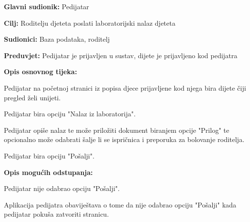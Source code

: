 					\noindent {}
					\begin{packed_item}
						
						\item \textbf{Glavni sudionik: }Pedijatar
						\item  \textbf{Cilj:} Roditelju djeteta poslati laboratorijski nalaz djeteta
						\item  \textbf{Sudionici:} Baza podataka, roditelj
						\item  \textbf{Preduvjet:} Pedijatar je prijavljen u sustav, dijete je prijavljeno kod pedijatra
						\item  \textbf{Opis osnovnog tijeka:}
						
						\item[] \begin{packed_enum}
							
							\item Pedijatar na početnoj stranici iz popisa djece prijavljene kod njega bira dijete čiji pregled želi unijeti.
							\item Pedijatar bira opciju "Nalaz iz laboratorija".
							\item Pedijatar opiše nalaz te može priložiti dokument biranjem opcije "Prilog" te opcionalno može odabrati šalje li se ispričnica i preporuka za bolovanje roditelja.
							\item Pedijatar bira opciju "Pošalji".
						\end{packed_enum}
						
						\item  \textbf{Opis mogućih odstupanja:}
						
						\item[] \begin{packed_item}
							
							\item[4.a] Pedijatar nije odabrao opciju "Pošalji".
							\item[] \begin{packed_enum}
								
								\item Aplikacija pedijatra obaviještava o tome da nije odabrao opciju "Pošalji" kada pedijatar pokuša zatvoriti stranicu.
							\end{packed_enum}
							
							
						\end{packed_item}
						
						
					\end{packed_item}
					
